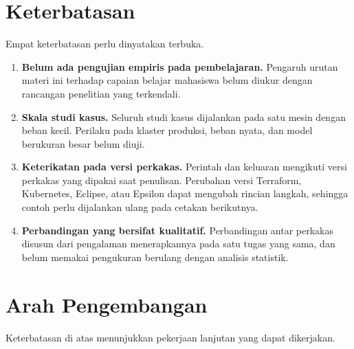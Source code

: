 \section*{Keterbatasan}

Empat keterbatasan perlu dinyatakan terbuka.

\begin{enumerate}
  \item \textbf{Belum ada pengujian empiris pada pembelajaran.} Pengaruh urutan
        materi ini terhadap capaian belajar mahasiswa belum diukur dengan
        rancangan penelitian yang terkendali.
  \item \textbf{Skala studi kasus.} Seluruh studi kasus dijalankan pada satu
        mesin dengan beban kecil. Perilaku pada klaster produksi, beban nyata,
        dan model berukuran besar belum diuji.
  \item \textbf{Keterikatan pada versi perkakas.} Perintah dan keluaran
        mengikuti versi perkakas yang dipakai saat penulisan. Perubahan versi
        Terraform, Kubernetes, Eclipse, atau Epsilon dapat mengubah rincian
        langkah, sehingga contoh perlu dijalankan ulang pada cetakan berikutnya.
  \item \textbf{Perbandingan yang bersifat kualitatif.} Perbandingan antar
        perkakas disusun dari pengalaman menerapkannya pada satu tugas yang
        sama, dan belum memakai pengukuran berulang dengan analisis statistik.
\end{enumerate}

\section*{Arah Pengembangan}

Keterbatasan di atas menunjukkan pekerjaan lanjutan yang dapat dikerjakan.

